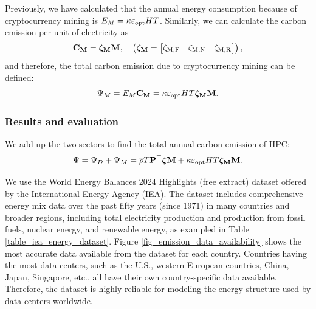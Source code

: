 \documentclass[12pt]{article}
\begin{document}
Previously, we have calculated that the annual energy consumption because of cryptocurrency mining is $E_M = \kappa \varepsilon_{\rm opt} HT$. Similarly, we can calculate the carbon emission per unit of electricity as
\begin{equation}
	\vb{C_M} = \boldsymbol{\rm \zeta_M} \vb{M}, \quad
	\left(
		\boldsymbol{\rm \zeta_M} =
		\begin{bmatrix}
			\zeta_{\rm M, F} & \zeta_{\rm M, N} & \zeta_{\rm M, R} \\
		\end{bmatrix}
	\right),
\end{equation}
and therefore, the total carbon emission due to cryptocurrency mining can be defined:
\begin{equation}
	\Psi_M = E_M \vb{C_M} = \kappa \varepsilon_{\rm opt} HT \boldsymbol{\rm \zeta_M} \vb{M}.
\end{equation}

\subsubsection{Results and evaluation}

We add up the two sectors to find the total annual carbon emission of HPC:
\begin{equation}
	\Psi = \Psi_D + \Psi_M
	= \overline{\rho} T \vb{P}^\top \boldsymbol{\zeta} \vb{M}
		+ \kappa \varepsilon_{\rm opt} HT \boldsymbol{\rm \zeta_M} \vb{M}.
\end{equation}

We use the World Energy Balances 2024 Highlights (free extract) dataset \citep{energy_mix_dataset} offered by the International Energy Agency (IEA). The dataset includes comprehensive energy mix data over the past fifty years (since 1971) in many countries and broader regions, including total electricity production and production from fossil fuels, nuclear energy, and renewable energy, as exampled in Table \ref{table_iea_energy_dataset}. Figure \ref{fig_emission_data_availability} shows the most accurate data available from the dataset for each country. Countries having the most data centers, such as the U.S., western European countries, China, Japan, Singapore, etc., all have their own country-specific data available. Therefore, the dataset is highly reliable for modeling the energy structure used by data centers worldwide.
\end{document}
